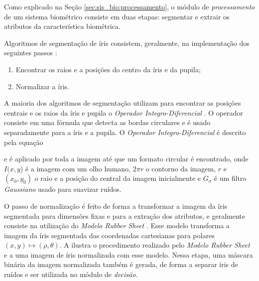 \par Como explicado na Seção \ref{sec:sis_bio:processamento}, o módulo de \textit{processamento} de um sistema biométrico consiste em duas etapas: segmentar e extrair os atributos da característica biométrica. 

\par Algoritmos de segmentação de íris consistem, geralmente, na implementação dos seguintes passos \cite{daugman2004, masek2003}:

\begin{enumerate}
    \item Encontrar os raios e a posições do centro da íris e da pupila;
    \item Normalizar a íris.
\end{enumerate}

\par A maioria dos algoritmos de segmentação utilizam para encontrar as posições centrais e os raios da íris e pupila o \textit{Operador Integro-Diferencial} \cite{daugman2004}. O operador consiste em uma fórmula que detecta as bordas circulares e é usado separadamente para a íris e a pupila. O \textit{Operador Integro-Diferencial} é descrito pela equação


\noindent e é aplicado por toda a imagem até que um formato circular é encontrado, onde $I(x,y$) é a imagem com um olho humano, $2\pi r$ o contorno da imagem, $r$ e $(x_{0}, y_{0})$ o raio e a posição do central da imagem inicialmente e $G_{\sigma}$ é um filtro \textit{Gaussiano} usado para suavizar ruídos.

\par O passo de normalização é feito de forma a transformar a imagem da íris segmentada para dimensões fixas e para a extração dos atributos, e geralmente consiste na utilização do \textit{Modelo Rubber Sheet} \cite{daugman2004}. Esse modelo transforma a imagem da íris segmentada das coordenadas cartesianas para polares $(x,y) \mapsto (\rho,\theta)$. A  ilustra o procedimento realizado pelo \textit{Modelo Rubber Sheet} e a  uma imagem de íris normalizada com esse modelo. Nessa etapa, uma máscara binária da imagem normalizada também é gerada, de forma a separar íris de ruídos e ser utilizada no módulo de \textit{decisão}.


